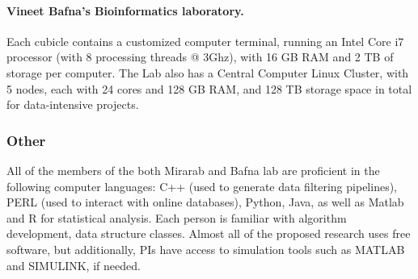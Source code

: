 \paragraph{Vineet Bafna's Bioinformatics laboratory.}%
Each cubicle contains a customized computer terminal, running an Intel Core i7 processor (with 8 processing threads @ 3Ghz), with 16 GB RAM and 2 TB of storage per computer. The Lab also has a Central Computer Linux Cluster, with 5 nodes, each with 24 cores and 128 GB RAM, and 128 TB storage space in total for data-intensive projects. 


\subsubsection*{Other}

All of the members of the both Mirarab and Bafna lab are proficient in the following computer languages: C++ (used to generate data filtering pipelines), PERL (used to interact with online databases), Python, Java, as well as Matlab and R for statistical analysis. Each person is familiar with algorithm development, data structure classes. 
Almost all of the proposed research uses free software, but additionally, PIs have access to simulation tools such as MATLAB and SIMULINK, if needed. 


